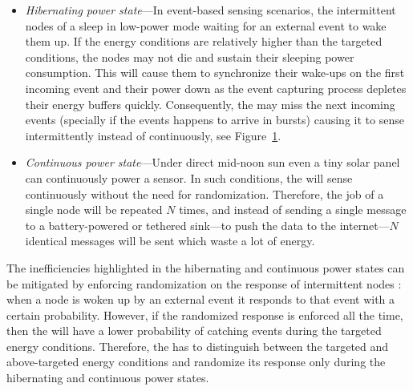 \begin{itemize}
\begin{figure}
		\label{fig:noRand}
\end{figure} 
%
		\item \label{it:hibernating} \textit{Hibernating power state}---In event-based sensing scenarios, the intermittent nodes of a \sys sleep in low-power mode waiting for an external event to wake them up. If the energy conditions are relatively higher than the targeted conditions, the nodes may not die and sustain their sleeping power consumption. This will cause them to synchronize their wake-ups on the first incoming event and their power down as the event capturing process depletes their energy buffers quickly. Consequently, the \sys may miss the next incoming events (specially if the events happens to arrive in bursts) causing it to sense intermittently instead of continuously, see Figure~\ref{fig:noRand}. 
		\item \label{it:continuous} \textit{Continuous power state}---Under direct mid-noon sun even a tiny solar panel can continuously power a sensor. In such conditions, the \sys will sense continuously without the need for randomization. Therefore, the job of a single node will be repeated $N$ times, and instead of sending a single message to a battery-powered or tethered sink---to push the data to the internet---$N$ identical messages will be sent which waste a lot of energy. 
				
\end{itemize}
%

The inefficiencies highlighted in the hibernating and continuous power states can be mitigated by enforcing randomization on the response of intermittent nodes 
: when a node is woken up by an external event it responds to that event with a certain probability. However, if the randomized response is enforced all the time, then the \sys will have a lower probability of catching events during the targeted energy conditions. Therefore, the \sys has to distinguish between the targeted and above-targeted energy conditions and randomize its response only during the hibernating and continuous power states. 


